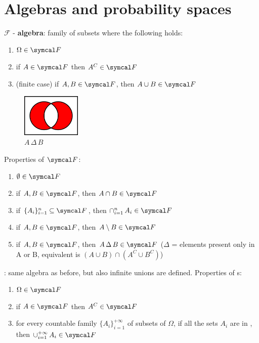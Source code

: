 \section{Algebras and probability spaces}
\begin{definition}
    $ \mathcal{F} $ - \textbf{algebra}: family of subsets where the following holds:
    \begin{enumerate}
        \item $ \Omega \in \eff $
        \item if $ A \in \eff $ then $ A^C \in \eff $
        \item (finite case) if $ A, B \in \eff $, then $ A \cup B \in \eff $
    \end{enumerate}
\end{definition}
\begin{figure}
    \centering
    \includegraphics[width=0.25\textwidth]{images/Venn0110.png}
    \caption*{$A \,\Delta\, B$}
\end{figure}
Properties of $\eff$:
\begin{enumerate}
    \item $\emptyset \in \eff$
    \item if $ A, B \in \eff $, then $ A \cap B \in \eff$
    \item if $ \{A_i\}^n_{i=1} \subseteq \eff$, then $\cap^n_{i=1}\, A_i \in \eff$
    \item if $A, B \in \eff $, then $A \setminus B \in \eff$
    \item if $A, B \in \eff$, then $A \,\Delta\, B \in \eff $ ($\Delta$ = elements present only in A or B, equivalent is $(A \cup B) \cap (A^C \cup B^C)$)
\end{enumerate}
\begin{definition}
    \sigal: same algebra as before, but also infinite unions are defined.
    Properties of \sigal s:
    \begin{enumerate}
        \item $ \Omega \in \eff $
        \item if $ A \in \eff $ then $ A^C \in \eff $
        \item for every countable family $ \{A_i\}^{+\infty}_{i=1} $ of subsets of $\Omega$, if all the sets $A_i$ are in \eff, then $\cup^{+\infty}_{i=1}\,A_i \in \eff$
    \end{enumerate}
\end{definition}
